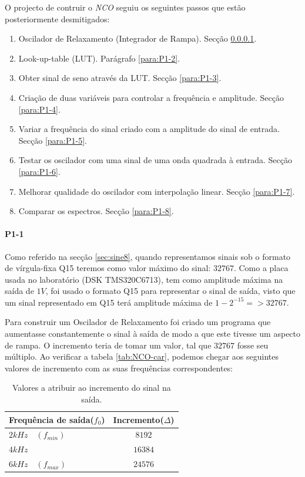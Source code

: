 \documentclass[11pt]{article}
\begin{document}
O projecto de contruir o \textit{NCO} seguiu os seguintes passos que estão posteriormente desmitigados:

\begin{enumerate}
	\item Oscilador de Relaxamento (Integrador de Rampa). Secção \ref{para:P1-1}.
	\item Look-up-table (LUT). Parágrafo \ref{para:P1-2}.
	\item Obter sinal de seno através da LUT. Secção \ref{para:P1-3}.
	\item Criação de duas variáveis para controlar a frequência e amplitude. Secção \ref{para:P1-4}.
	\item Variar a frequência do sinal criado com a amplitude do sinal de entrada. Secção \ref{para:P1-5}.
	\item Testar os oscilador com uma sinal de uma onda quadrada à entrada.  Secção \ref{para:P1-6}.
	\item Melhorar qualidade do oscilador com interpolação linear.  Secção \ref{para:P1-7}.
	\item Comparar os espectros.  Secção \ref{para:P1-8}.
\end{enumerate}

\paragraph{P1-1}\label{para:P1-1}

Como referido na secção \ref{sec:sine8}, quando representamos sinais sob o formato de vírgula-fixa Q15 teremos como valor máximo do sinal: $32767$. Como a placa usada no laboratório (DSK TMS320C6713), tem como amplitude máxima na saída de $1 V$, foi usado o formato Q15 para representar o sinal de saída, visto que um sinal representado em Q15 terá amplitude máxima de $ 1-2^{-15} => 32767 $.

Para construir um Oscilador de Relaxamento foi criado um programa que aumentasse constantemente o sinal à saída de modo a que este tivesse um aspecto de rampa. O incremento teria de tomar um valor, tal que $32767$ fosse seu múltiplo. Ao verificar a tabela \ref{tab:NCO-car}, podemos chegar aos seguintes valores de incremento com as suas frequências correspondentes:


\begin{table}[H]
	\centering
	\caption{Valores a atribuir ao incremento do sinal na saída.}
	\label{tab:incrementos}
	\begin{tabular}[c]{|l||c|}
		\hline \textbf{Frequência de saída($f_0$)} & \textbf{Incremento($\Delta$)}\\ 
		\hline $ 2 kHz \quad (f_{min}) $ & $ 8192 $\\ 
		\hline $ 4 kHz $ & $ 16384 $  \\ 
		\hline $ 6 kHz \quad (f_{max}) $ & $ 24576 $ \\ 
		\hline
	\end{tabular}
\end{table}
\end{document}
